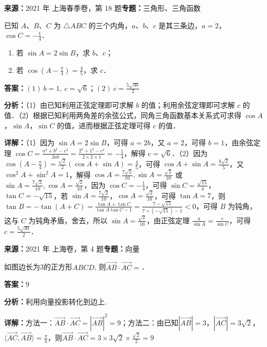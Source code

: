 \begin{question}[points=14]
\textbf{来源：}2021 年 上海春季卷，第 18 题\quad \textbf{专题：}三角形、三角函数\par
已知 $A$、$B$、$C$ 为 $\triangle ABC$ 的三个内角，$a$、$b$、$c$ 是其三条边，$a=2$，$\cos C=-\frac{1}{4}$．\begin{enumerate}\item[(1)] 若 $\sin A=2\sin B$，求 $b$、$c$；\item[(2)] 若 $\cos(A-\frac{\pi}{4})=\frac{4}{5}$，求 $c$．\end{enumerate}
\begin{solution}
\textbf{答案：}$(1)\ b=1,\ c=\sqrt{6}$；$(2)\ c=\frac{5\sqrt{30}}{2}$

\textbf{分析：}（1）由已知利用正弦定理即可求解 $b$ 的值；利用余弦定理即可求解 $c$ 的值．\newline（2）根据已知利用两角差的余弦公式，同角三角函数基本关系式可求得 $\cos A$，$\sin A$，$\sin C$ 的值，进而根据正弦定理可得 $c$ 的值．

\textbf{详解：}（1）因为 $\sin A=2\sin B$，可得 $a=2b$，又 $a=2$，可得 $b=1$，由余弦定理 $\cos C=\frac{a^2+b^2-c^2}{2ab}=\frac{2^2+1^2-c^2}{2\times 2\times 1}=-\frac{1}{4}$，解得 $c=\sqrt{6}$．\newline（2）因为 $\cos(A-\frac{\pi}{4})=\frac{\sqrt{2}}{2}(\cos A+\sin A)=\frac{4}{5}$，可得 $\cos A+\sin A=\frac{4\sqrt{2}}{5}$，又 $\cos^2 A+\sin^2 A=1$，解得 $\cos A=\frac{7\sqrt{2}}{10},\sin A=\frac{\sqrt{2}}{10}$ 或 $\sin A=\frac{7\sqrt{2}}{10},\cos A=\frac{\sqrt{2}}{10}$，因为 $\cos C=-\frac{1}{4}$，可得 $\sin C=\frac{\sqrt{15}}{4}$，$\tan C=-\sqrt{15}$，若 $\sin A=\frac{7\sqrt{2}}{10}$，$\cos A=\frac{\sqrt{2}}{10}$，可得 $\tan A=7$，则 $\tan B=-\tan(A+C)=\frac{\tan A+\tan C}{\tan A\tan C-1}=\frac{7-\sqrt{15}}{7\times(-\sqrt{15})-1}<0$，可得 $B$ 为钝角，这与 $C$ 为钝角矛盾，舍去，所以 $\sin A=\frac{\sqrt{2}}{10}$，由正弦定理 $\frac{a}{\sin A}=\frac{c}{\sin C}$，可得 $c=\frac{5\sqrt{30}}{2}$．
\end{solution}
\end{question}

\begin{question}[points=4]
\textbf{来源：}2021 年 上海卷，第 4 题\quad \textbf{专题：}向量\par
如图边长为3的正方形$ABCD$, 则$\overrightarrow{AB}\cdot\overrightarrow{AC}=$．
\fillin[{$9$}]
\begin{solution}
\textbf{答案：}$9$

\textbf{分析：}利用向量投影转化到边上.

\textbf{详解：}方法一：$\overrightarrow{AB}\cdot\overrightarrow{AC}=|\overrightarrow{AB}|^2=9$；方法二：由已知$|\overrightarrow{AB}|=3$，$|\overrightarrow{AC}|=3\sqrt{2}$，$\langle\overrightarrow{AC},\overrightarrow{AB}\rangle=\frac{\pi}{4}$，则$\overrightarrow{AB}\cdot\overrightarrow{AC}=3\times3\sqrt{2}\times\frac{\sqrt{2}}{2}=9$
\end{solution}
\end{question}

